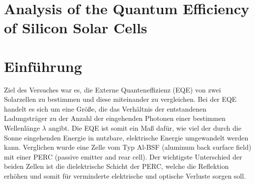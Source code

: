 \documentclass[ngerman, twocolumn]{scrartcl}
\begin{document}
\section*{Analysis of the Quantum Efficiency of Silicon Solar Cells}
\section{Einführung}
Ziel des Versuches war es, die Externe Quanteneffizienz (EQE) von zwei Solarzellen zu bestimmen und diese miteinander zu vergleichen. Bei der EQE handelt es sich um eine Größe, die das Verhältnis der entstandenen Ladungsträger zu der Anzahl der eingehenden Photonen einer bestimmen Wellenlänge $\lambda$ angibt. Die EQE ist somit ein Maß dafür, wie viel der durch die Sonne eingehenden Energie in nutzbare, elektrische Energie umgewandelt werden kann. Verglichen wurde eine Zelle vom Typ Al-BSF (aluminum back surface field) mit einer PERC (passive emitter and rear cell). Der wichtigste Unterschied der beiden Zellen ist die dielektrische Schicht der PERC, welche die Reflektion erhöhen und somit für verminderte elektrische und optische Verluste sorgen soll.
\end{document}
